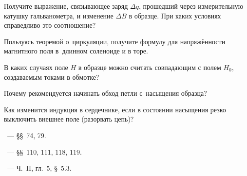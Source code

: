 \begin{lab:questions}

	\item Получите выражение, связывающее заряд $\Delta q$, прошедший через
    измерительную катушку гальванометра, и изменение $\Delta B$ в образце.
    При каких условиях справедливо это соотношение?

	\item Пользуясь теоремой о~циркуляции, получите формулу для напряжённости
магнитного поля в~длинном соленоиде и в торе.

    \item В каких случаях поле $H$ в образце можно считать совпадающим
    с полем $H_0$, создаваемым токами в обмотке?

    \item Почему рекомендуется начинать обход петли с~насыщения образца?

    \item Как изменится индукция в сердечнике, если в состоянии насыщения
    резко выключить внешнее поле (разорвать цепь)?
\end{lab:questions}


\begin{lab:literature}

	\item \SivuhinIII~--- \S\S~74, 79.

	\item \Kalashnikov~--- \S\S~110, 111, 118, 119.

	\item \KingLokOlh~--- Ч.~II, гл.~5, \S~5.3.

\end{lab:literature}
